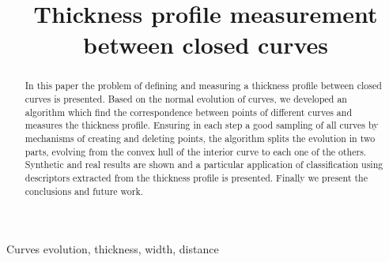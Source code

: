 \documentclass{article}
\title{Thickness profile measurement between closed curves}
\begin{document}
\maketitle

\begin{abstract}
  In this paper the problem of defining and measuring a thickness profile between closed curves is presented. Based on the normal evolution of curves, we developed an algorithm which find the correspondence between points of different curves and measures the thickness profile. Ensuring in each step a good sampling of all curves by mechanisms of creating and deleting points, the algorithm splits the evolution in two parts, evolving from the convex hull of the interior curve to each one of the others. Synthetic and real results are shown and a particular application of classification using descriptors extracted from the thickness profile is presented. Finally we present the conclusions and future work.
\end{abstract}

\begin{keywords}
  Curves evolution, thickness, width, distance
\end{keywords}
\end{document}
